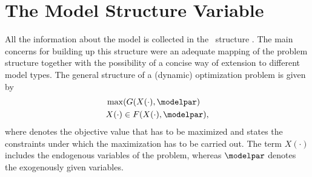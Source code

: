 \section{The Model Structure Variable}
\label{sec:ocStruct}
All the information about the model is collected in the \MATL\ structure \ocStruct. The main concerns for building up this structure were an adequate mapping of the problem structure together with the possibility of a concise way of extension to different model types. The general structure of a (dynamic) optimization problem is given by 
\begin{subequations}
\label{eq:gen_opt_prob}
\begin{align}
	&\max(G(X(\cdot),\modelpar)\label{eq:gen_opt_prob1}\\
	&X(\cdot)\in F(X(\cdot),\modelpar),\label{eq:gen_opt_prob2}
\end{align}
\end{subequations}
where  denotes the objective value that has to be maximized and  states the constraints under which the maximization has to be carried out. The term $X(\cdot)$ includes the endogenous variables of the problem, whereas $\modelpar$ denotes the exogenously given variables.

